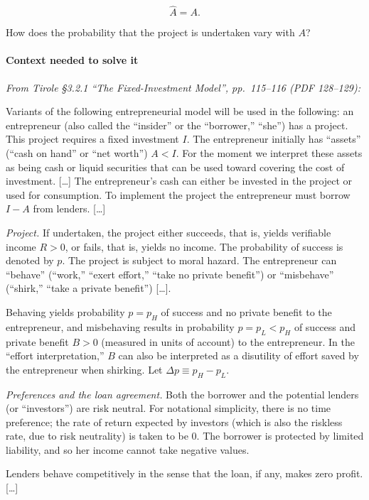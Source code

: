 \documentclass[11pt,a4paper]{article}
\begin{document}
\[\hat A = A.\]

How does the probability that the project is undertaken vary with \(A\)?

\paragraph{Context needed to solve it}

\emph{From Tirole §3.2.1 ``The Fixed-Investment Model'', pp.~115--116 (PDF 128--129):}

Variants of the following entrepreneurial model will be used in the following: an entrepreneur (also
called the ``insider'' or the ``borrower,'' ``she'') has a project. This project requires a fixed
investment \(I\). The entrepreneur initially has ``assets'' (``cash on hand'' or ``net worth'')
\(A < I\). For the moment we interpret these assets as being cash or liquid securities that can be
used toward covering the cost of investment. {[}\ldots{]} The entrepreneur's cash can either be
invested in the project or used for consumption. To implement the project the entrepreneur must
borrow \(I - A\) from lenders. {[}\ldots{]}

\emph{Project.} If undertaken, the project either succeeds, that is, yields verifiable income
\(R > 0\), or fails, that is, yields no income. The probability of success is denoted by \(p\). The
project is subject to moral hazard. The entrepreneur can ``behave'' (``work,'' ``exert effort,''
``take no private benefit'') or ``misbehave'' (``shirk,'' ``take a private benefit'') {[}\ldots{]}.

Behaving yields probability \(p = p_H\) of success and no private benefit to the entrepreneur, and
misbehaving results in probability \(p = p_L < p_H\) of success and private benefit \(B > 0\)
(measured in units of account) to the entrepreneur. In the ``effort interpretation,'' \(B\) can also
be interpreted as a disutility of effort saved by the entrepreneur when shirking. Let
\(\Delta p \equiv p_H - p_L\).

\emph{Preferences and the loan agreement.} Both the borrower and the potential lenders (or
``investors'') are risk neutral. For notational simplicity, there is no time preference; the rate of
return expected by investors (which is also the riskless rate, due to risk neutrality) is taken to
be 0. The borrower is protected by limited liability, and so her income cannot take negative values.

Lenders behave competitively in the sense that the loan, if any, makes zero profit. {[}\ldots{]}
\end{document}

